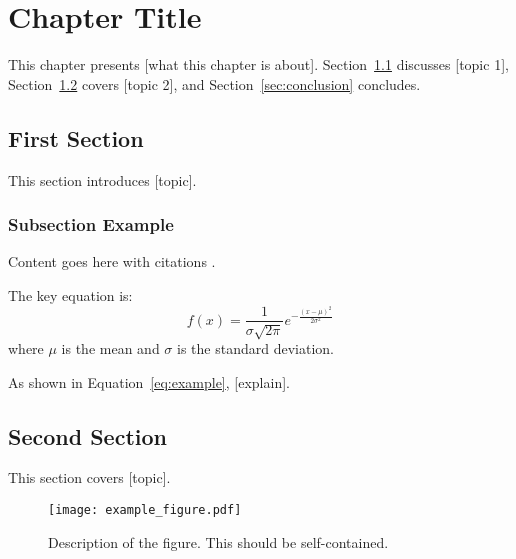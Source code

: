 
\chapter{Chapter Title}
\label{ch:chapterlabel}

This chapter presents [what this chapter is about]. Section~\ref{sec:section1} discusses [topic 1], Section~\ref{sec:section2} covers [topic 2], and Section~\ref{sec:conclusion} concludes.

\section{First Section}
\label{sec:section1}

This section introduces [topic].

\subsection{Subsection Example}
\label{subsec:example}

Content goes here with citations \cite{smith2023example}.

The key equation is:
\begin{equation}
\label{eq:example}
    f(x) = \frac{1}{{\sigma \sqrt {2\pi } }}e^{-\frac{(x - \mu)^2}{2\sigma^2}}
\end{equation}
where $\mu$ is the mean and $\sigma$ is the standard deviation.

As shown in Equation~\ref{eq:example}, [explain].

\section{Second Section}
\label{sec:section2}

This section covers [topic].

\begin{figure}[htbp]
    \centering
    \texttt{[image: example\_figure.pdf]}
    \caption{Description of the figure. This should be self-contained.}
    \label{fig:example}
\end{figure}


